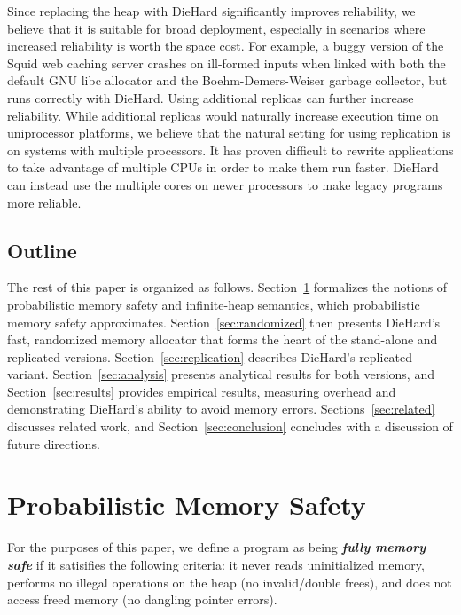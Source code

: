 \documentclass{sig-alternate}
\begin{document}
Since replacing the heap with DieHard significantly improves
reliability, we believe that it is suitable for broad deployment,
especially in scenarios where increased reliability is worth the space
cost. For example, a buggy version of the Squid web caching server
crashes on ill-formed inputs when linked with both the default GNU
libc allocator and the Boehm-Demers-Weiser garbage collector, but runs
correctly with DieHard. Using additional replicas can further increase
reliability. While additional replicas would naturally increase
execution time on uniprocessor platforms, we believe that the natural
setting for using replication is on systems with multiple
processors. It has proven difficult to rewrite applications to take
advantage of multiple CPUs in order to make them run faster. DieHard
can instead use the multiple cores on newer processors to make legacy
programs more reliable.

\subsection{Outline}

\noindent 
The rest of this paper is organized as
follows. Section~\ref{sec:probabilistic} formalizes the notions of
probabilistic memory safety and infinite-heap semantics, which
probabilistic memory safety approximates. Section~\ref{sec:randomized}
then presents DieHard's fast, randomized memory allocator that forms
the heart of the stand-alone and replicated
versions. Section~\ref{sec:replication} describes DieHard's replicated
variant. Section~\ref{sec:analysis} presents analytical results for
both versions, and Section~\ref{sec:results} provides empirical
results, measuring overhead and demonstrating DieHard's ability to
avoid memory errors. Sections~\ref{sec:related} discusses related
work, and Section~\ref{sec:conclusion} concludes with a discussion of
future directions.


\section{Probabilistic Memory Safety}
\label{sec:probabilistic}

For the purposes of this paper, we define a program as being \emph{\bf
fully memory safe} if it satisifies the following criteria: it never
reads uninitialized memory, performs no illegal operations on the heap
(no invalid/double frees), and does not access freed memory (no
dangling pointer errors).
\end{document}
